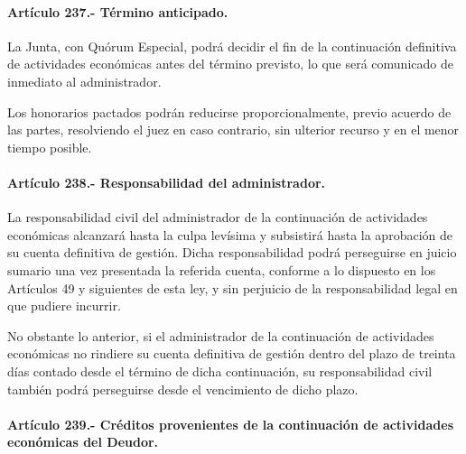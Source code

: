 \documentclass[
]{book}
\begin{document}
\hypertarget{artuxedculo-237.--tuxe9rmino-anticipado.}{%
\paragraph*{Artículo 237.- Término anticipado.}\label{artuxedculo-237.--tuxe9rmino-anticipado.}}

La Junta, con Quórum Especial, podrá decidir el fin de la continuación definitiva de actividades económicas antes del término previsto, lo que será comunicado de inmediato al administrador.

Los honorarios pactados podrán reducirse proporcionalmente, previo acuerdo de las partes, resolviendo el juez en caso contrario, sin ulterior recurso y en el menor tiempo posible.

\hypertarget{artuxedculo-238.--responsabilidad-del-administrador.}{%
\paragraph*{Artículo 238.- Responsabilidad del administrador.}\label{artuxedculo-238.--responsabilidad-del-administrador.}}

La responsabilidad civil del administrador de la continuación de actividades económicas alcanzará hasta la culpa levísima y subsistirá hasta la aprobación de su cuenta definitiva de gestión. Dicha responsabilidad podrá perseguirse en juicio sumario una vez presentada la referida cuenta, conforme a lo dispuesto en los Artículos 49 y siguientes de esta ley, y sin perjuicio de la responsabilidad legal en que pudiere incurrir.

No obstante lo anterior, si el administrador de la continuación de actividades económicas no rindiere su cuenta definitiva de gestión dentro del plazo de treinta días contado desde el término de dicha continuación, su responsabilidad civil también podrá perseguirse desde el vencimiento de dicho plazo.

\hypertarget{artuxedculo-239.--cruxe9ditos-provenientes-de-la-continuaciuxf3n-de-actividades-econuxf3micas-del-deudor.}{%
\paragraph*{Artículo 239.- Créditos provenientes de la continuación de actividades económicas del Deudor.}\label{artuxedculo-239.--cruxe9ditos-provenientes-de-la-continuaciuxf3n-de-actividades-econuxf3micas-del-deudor.}}
\end{document}
